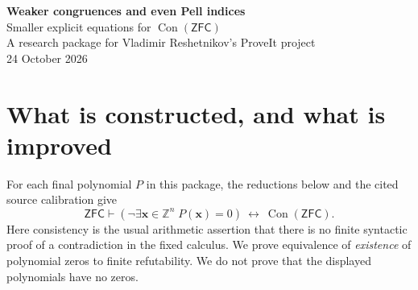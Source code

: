 \documentclass[11pt]{article}
\newcommand{\Z}{\mathbb Z}\newcommand{\N}{\mathbb N}
\newcommand{\Con}{\operatorname{Con}}\newcommand{\ZFC}{\mathsf{ZFC}}
\theoremstyle{definition}\newtheorem{definition}[theorem]{Definition}
\theoremstyle{remark}\newtheorem{remark}[theorem]{Remark}
\begin{document}
\begin{center}
{\LARGE\bfseries Weaker congruences and even Pell indices}\\[7pt]
{\Large Smaller explicit equations for $\Con(\ZFC)$}\\[10pt]
{\normalsize A research package for Vladimir Reshetnikov's ProveIt project}\\[3pt]
{\normalsize 24 October 2026}
\end{center}
\begin{abstract}
We give two concrete improvements to the explicit Diophantine consistency
equations in a pinned ProveIt snapshot. First, we weaken a divisibility
carrier, use the actual coefficient size to resolve its fifth-power
congruence, and combine two congruences in one homogeneous intersective
polynomial. The resulting equations have twelve unrestricted integer
unknowns and exact degrees $768,784,800,816,1040$, with respectively
$161,154,147,144,140$ binary arithmetic operations. The prior comparable
points had degrees $1200$ and $1456$ with $145$ and $141$ operations.
Second, in the direct C222 construction, we combine signs for repeated
bounded intervals and replace power requests $m=n^k$ by $m^2=n^{2k}$.
Even Pell indices eliminate twelve index-sign predicates. The complete
result is a quartic in $566$ unrestricted integers, with $6431$ monomials
and coefficient height $2445790974704$, compared with $604$ variables and
$9676$ monomials at the same height in the pinned parent. Every equation,
constant payload, projection certificate and verification program is
supplied. The new reductions have ordinary unbounded proofs; their
consistency interpretation composes with the explicitly cited existing
source/calculus calibration. No new Lean or Rocq end-to-end proof,
unconditional consistency assertion, global optimum, or literature-wide
priority claim is made.
\end{abstract}

\section{What is constructed, and what is improved}

For each final polynomial $P$ in this package, the reductions below and
the cited source calibration give
\begin{equation}\label{eq:target}
 \ZFC\vdash
 \left(\neg\exists\mathbf x\in\Z^n\;P(\mathbf x)=0\right)
 \ \longleftrightarrow\ \Con(\ZFC).
\end{equation}
Here consistency is the usual arithmetic assertion that there is no finite
syntactic proof of a contradiction in the fixed calculus. We prove
equivalence of \emph{existence} of polynomial zeros to finite refutability.
We do not prove that the displayed polynomials have no zeros.
\end{document}
